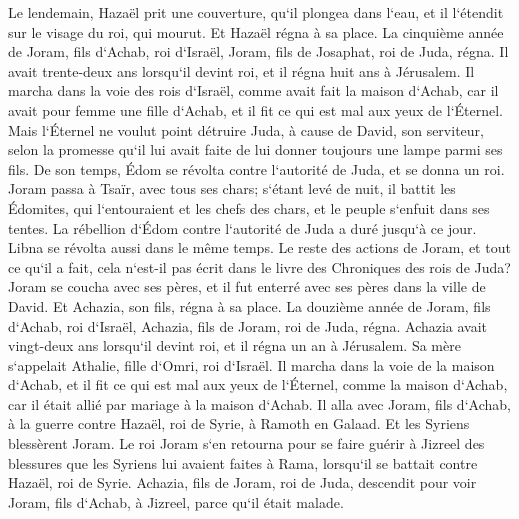 \verse Le lendemain, Hazaël prit une couverture, qu`il plongea dans l`eau, et il l`étendit sur le visage du roi, qui mourut. Et Hazaël régna à sa place. 
\verse La cinquième année de Joram, fils d`Achab, roi d`Israël, Joram, fils de Josaphat, roi de Juda, régna. 
\verse Il avait trente-deux ans lorsqu`il devint roi, et il régna huit ans à Jérusalem. 
\verse Il marcha dans la voie des rois d`Israël, comme avait fait la maison d`Achab, car il avait pour femme une fille d`Achab, et il fit ce qui est mal aux yeux de l`Éternel. 
\verse Mais l`Éternel ne voulut point détruire Juda, à cause de David, son serviteur, selon la promesse qu`il lui avait faite de lui donner toujours une lampe parmi ses fils. 
\verse De son temps, Édom se révolta contre l`autorité de Juda, et se donna un roi. 
\verse Joram passa à Tsaïr, avec tous ses chars; s`étant levé de nuit, il battit les Édomites, qui l`entouraient et les chefs des chars, et le peuple s`enfuit dans ses tentes. 
\verse La rébellion d`Édom contre l`autorité de Juda a duré jusqu`à ce jour. Libna se révolta aussi dans le même temps. 
\verse Le reste des actions de Joram, et tout ce qu`il a fait, cela n`est-il pas écrit dans le livre des Chroniques des rois de Juda? 
\verse Joram se coucha avec ses pères, et il fut enterré avec ses pères dans la ville de David. Et Achazia, son fils, régna à sa place. 
\verse La douzième année de Joram, fils d`Achab, roi d`Israël, Achazia, fils de Joram, roi de Juda, régna. 
\verse Achazia avait vingt-deux ans lorsqu`il devint roi, et il régna un an à Jérusalem. Sa mère s`appelait Athalie, fille d`Omri, roi d`Israël. 
\verse Il marcha dans la voie de la maison d`Achab, et il fit ce qui est mal aux yeux de l`Éternel, comme la maison d`Achab, car il était allié par mariage à la maison d`Achab. 
\verse Il alla avec Joram, fils d`Achab, à la guerre contre Hazaël, roi de Syrie, à Ramoth en Galaad. Et les Syriens blessèrent Joram. 
\verse Le roi Joram s`en retourna pour se faire guérir à Jizreel des blessures que les Syriens lui avaient faites à Rama, lorsqu`il se battait contre Hazaël, roi de Syrie. Achazia, fils de Joram, roi de Juda, descendit pour voir Joram, fils d`Achab, à Jizreel, parce qu`il était malade. 

\chapter{}

